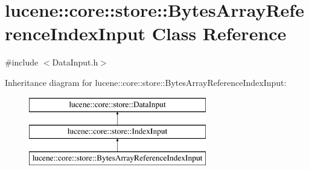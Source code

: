 \hypertarget{classlucene_1_1core_1_1store_1_1BytesArrayReferenceIndexInput}{}\section{lucene\+:\+:core\+:\+:store\+:\+:Bytes\+Array\+Reference\+Index\+Input Class Reference}
\label{classlucene_1_1core_1_1store_1_1BytesArrayReferenceIndexInput}


{\ttfamily \#include $<$Data\+Input.\+h$>$}

Inheritance diagram for lucene\+:\+:core\+:\+:store\+:\+:Bytes\+Array\+Reference\+Index\+Input\+:\begin{figure}[H]
\begin{center}
\leavevmode
\includegraphics[height=3.000000cm]{classlucene_1_1core_1_1store_1_1BytesArrayReferenceIndexInput}
\end{center}
\end{figure}
